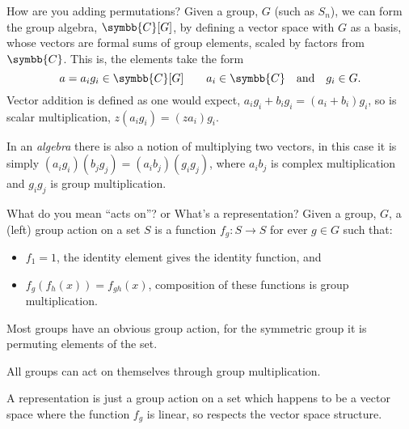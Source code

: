 \documentclass{beamer}
\newcommand{\define}[1]{\alert{#1}}
\newcommand{\complex}{\symbb{C}}
\begin{document}
    \begin{frame}{How are you adding permutations?}
        Given a group, \(G\) (such as \(S_n\)), we can form the \define{group algebra}, \(\complex[G]\), by defining a vector space with \(G\) as a basis, whose vectors are formal sums of group elements, scaled by factors from \(\complex\).
        This is, the elements take the form
        \begin{equation*}
            a = a_i g_i \in \complex[G] \qquad a_i \in \complex \quad\text{and}\quad g_i \in G.
        \end{equation*}
        Vector addition is defined as one would expect, \(a_i g_i + b_i g_i = (a_i + b_i)g_i\), so is scalar multiplication, \(z(a_i g_i) = (za_i) g_i\).
        
        In an \emph{algebra} there is also a notion of multiplying two vectors, in this case it is simply \((a_i g_i)(b_j g_j) = (a_ib_j)(g_ig_j)\), where \(a_ib_j\) is complex multiplication and \(g_ig_j\) is group multiplication.
    \end{frame}
    
    \begin{frame}{What do you mean \enquote{acts on}? or What's a representation?}
        Given a group, \(G\), a (left) group action on a set \(S\) is a function \(f_g \colon S \to S\) for ever \(g \in G\) such that:
        \begin{itemize}
            \item \(f_1 = 1\), the identity element gives the identity function, and
            \item \(f_{g}(f_{h}(x)) = f_{gh}(x)\), composition of these functions is group multiplication.
        \end{itemize}
        
        Most groups have an obvious group action, for the symmetric group it is permuting elements of the set.
        
        All groups can act on themselves through group multiplication.
        
        A representation is just a group action on a set which happens to be a vector space where the function \(f_g\) is linear, so respects the vector space structure.
    \end{frame}
    
\end{document}
